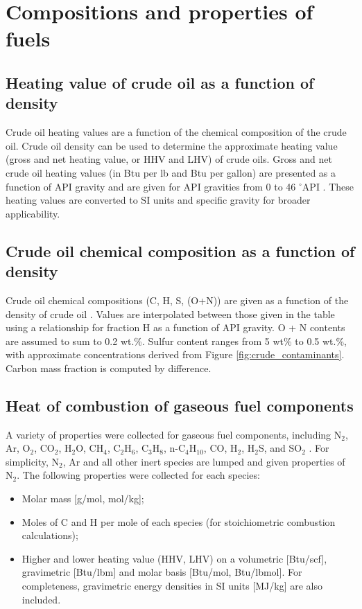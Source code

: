 \documentclass[11pt]{report}
\newcommand{\marg}[1]{{\footnotesize\textit{\textcolor{stanford}{'#1'}}}}
\newcommand{\marginnote}[1]{\marginpar{\marg{#1}}}
\begin{document}
{{{{%
\section{Compositions and properties of fuels}\label{sec:properties_fuels}


\subsection{Heating value of crude oil as a function of density}

Crude \marginnote{Fuel Specs Table 1.1} oil heating values are a function of the chemical composition of the crude oil. Crude oil density can be used to determine the approximate heating value (gross and net heating value, or HHV and LHV) of crude oils. Gross and net crude oil heating values (in Btu per lb and Btu per gallon) are presented as a function of API gravity and are given for API gravities from 0 to 46 $^\circ$API \cite[Table 11]{Schmidt1985}. These heating values are converted to SI units and specific gravity for broader applicability.

\subsection{Crude oil chemical composition as a function of density}

Crude \marginnote{Fuel Specs Table 1.2} oil chemical compositions (C, H, S, (O+N)) are given as a function of the density of crude oil \cite[Table 9]{Schmidt1985}. Values are interpolated between those given in the table using a relationship for fraction H as a function of API gravity. O + N contents are assumed to sum to 0.2 wt.\%. Sulfur content ranges from 5 wt\% to 0.5 wt.\%, with approximate concentrations derived from Figure \ref{fig:crude_contaminants}. Carbon mass fraction is computed by difference. 

\subsection{Heat of combustion of gaseous fuel components}

A variety of properties were collected for gaseous fuel components, \marginnote{Fuel Specs Table 1.3 } including N$_2$, Ar, O$_2$, CO$_2$, H$_2$O, CH$_4$, C$_2$H$_6$, C$_3$H$_8$, n-C$_4$H$_{10}$, CO, H$_2$, H$_2$S, and SO$_2$ \cite[Chapter 17]{Kutz2006} \cite{Ganapathy2003}. For simplicity, N$_2$, Ar and all other inert species are lumped and given properties of N$_2$. The following properties were collected for each species:
\begin{itemize}
\item Molar mass [g/mol, mol/kg];
\item Moles of C and H per mole of each species (for stoichiometric combustion calculations);
\item Higher and lower heating value (HHV, LHV) on a volumetric [Btu/scf], gravimetric [Btu/lbm] and molar basis [Btu/mol, Btu/lbmol]. For completeness, gravimetric energy densities in SI units [MJ/kg] are also included.
\end{itemize} 

}}}}
\end{document}
